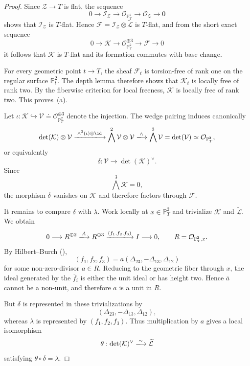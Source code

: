 \documentclass[11pt]{amsart} %
\newcommand{\lar}{\longrightarrow}
\theoremstyle{definition}
\def\NZQ{\mathbb}               %
\def\PP{{\NZQ P}}
\begin{document}
\begin{proof}
Since $\mathcal Z\lar T$ is flat, the sequence
\[
0\lar\mathcal I_{\mathcal Z}
\lar\mathcal O_{\PP^2_T}
\lar\mathcal O_{\mathcal Z}
\lar0
\]
shows that $\mathcal I_{\mathcal Z}$ is $T$-flat. Hence \(\mathcal F
=\mathcal I_{\mathcal Z}\otimes\widetilde{\mathcal L}
\)
is $T$-flat, and from the short exact sequence
\[
0\lar\mathcal K
\lar\mathcal O_{\PP^2_T}^{\oplus3}
\lar\mathcal F
\lar0
\]
it follows that $\mathcal K$ is $T$-flat and its formation commutes
with base change.

For every geometric point $t\lar T$, the sheaf $\mathcal F_t$ is
torsion-free of rank one on the regular surface $\PP^2_t$. The depth
lemma therefore shows that $\mathcal K_t$ is locally free of rank
two. By the fiberwise criterion for local freeness, $\mathcal K$ is
locally free of rank two. This proves~(a).

Let
\(
\iota:\mathcal K\hookrightarrow
\mathcal V\doteq\mathcal O_{\PP^2_T}^{\oplus3}\) denote the injection. The wedge pairing induces canonically
\[
\det(\mathcal K)\otimes\mathcal V
\xlongrightarrow{\;\wedge^2(\iota)\otimes\id\;}
\bigwedge^2\mathcal V\otimes\mathcal V
\xlongrightarrow{\;\wedge\;}
\bigwedge^3\mathcal V
=
\det(\mathcal V) \simeq \mathcal{O}_{\mathbb{P}^2_T},
\]
or equivalently
\[
\delta:
\mathcal V\longrightarrow\det(\mathcal K)^\vee.
\]
Since
\[
\bigwedge^3\mathcal K=0,
\]
the morphism $\delta$ vanishes on $\mathcal K$ and therefore factors
through $\mathcal F$.

It remains to compare $\delta$ with $\lambda$. Work locally at
$x\in\PP^2_T$ and trivialize $\mathcal K$ and
$\widetilde{\mathcal L}$. We obtain
\[
0\lar R^{\oplus2}
\xlongrightarrow{A}
R^{\oplus3}
\xlongrightarrow{(f_1,f_2,f_3)}
I
\lar0,
\qquad
R=\mathcal O_{\PP^2_T,x}.
\]
By Hilbert--Burch (\cite[Theorem~20.15]{EisenbudBook}),
\[
(f_1,f_2,f_3)
=
a(\Delta_{23},-\Delta_{13},\Delta_{12})
\]
for some non-zero-divisor $a\in R$. Reducing to the geometric fiber
through $x$, the ideal generated by the $\overline f_i$ is either the
unit ideal or has height two. Hence $\overline a$ cannot be a
non-unit, and therefore $a$ is a unit in $R$.

But $\delta$ is represented in these trivializations by
\[
(\Delta_{23},-\Delta_{13},\Delta_{12}),
\]
whereas $\lambda$ is represented by \((f_1,f_2,f_3)\). Thus multiplication by $a$ gives a local isomorphism
\[
\theta:
\det(\mathcal K)^\vee
\xlongrightarrow{\sim}
\widetilde{\mathcal L}
\]
satisfying \(\theta\circ\delta=\lambda\).


\end{proof}
\end{document}
